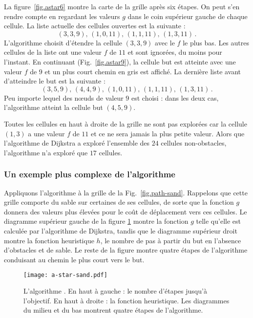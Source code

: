La figure~\ref{fig.astar6} montre la carte de la grille après six étapes. On peut s'en rendre compte en regardant les valeurs $g$ dans le coin supérieur gauche de chaque cellule. La liste actuelle des cellules ouvertes est la suivante :
\[
(3,3,9),\, (1,0,11),\, (1,1,11),\, (1,3,11)\,.
\]
L'algorithme \astar{} choisit d'étendre la cellule $(3,3,9)$ avec le $f$ le plus bas. Les autres cellules de la liste ont une valeur $f$ de $11$ et sont ignorées, du moins pour l'instant. En continuant (Fig.~\ref{fig.astar9}), la cellule but est atteinte avec une valeur $f$ de $9$ et un plus court chemin en gris est affiché. La dernière liste avant d'atteindre le but est la suivante :
\[
(3,5,9),\, (4,4,9),\, (1,0,11),\, (1,1,11),\, (1,3,11)\,.
\]
Peu importe lequel des nœuds de valeur $9$ est choisi : dans les deux cas, l'algorithme atteint la cellule but $(4,5,9)$.

Toutes les cellules en haut à droite de la grille ne sont pas explorées car la cellule $(1,3)$ a une valeur $f$ de $11$ et ce ne sera jamais la plus petite valeur. Alors que l'algorithme de Dijkstra a exploré l'ensemble des $24$ cellules non-obstacles, l'algorithme \astar{} n'a exploré que $17$ cellules.

\subsubsection*{Un exemple plus complexe de l'algorithme \astar{}}

Appliquons l'algorithme \astar{} à la grille de la Fig.~\ref{fig.path-sand}. Rappelons que cette grille comporte du sable sur certaines de ses cellules, de sorte que la fonction $g$ donnera des valeurs plus élevées pour le coût de déplacement vers ces cellules. Le diagramme supérieur gauche de la figure \ref{fig.a-star} montre la fonction $g$ telle qu'elle est calculée par l'algorithme de Dijkstra, tandis que le diagramme supérieur droit montre la fonction heuristique $h$, le nombre de pas à partir du but en l'absence d'obstacles et de sable. Le reste de la figure montre quatre étapes de l'algorithme conduisant au chemin le plus court vers le but.

\begin{figure}
\begin{center}
\texttt{[image: a-star-sand.pdf]}
\end{center}
\caption{L'algorithme \astar{}. En haut à gauche : le nombre d'étapes jusqu'à l'objectif. En haut à droite : la fonction heuristique. Les diagrammes du milieu et du bas montrent quatre étapes de l'algorithme.}\label{fig.a-star}
\end{figure}

